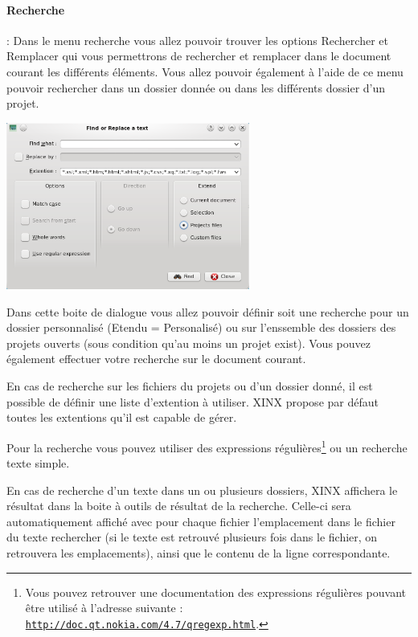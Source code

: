 \documentclass[a4paper,10pt,twoside]{book}
\begin{document}
\paragraph{Recherche} : Dans le menu recherche vous allez pouvoir trouver les options Rechercher et Remplacer qui vous permettrons de rechercher et remplacer dans le document courant les différents éléments. Vous allez pouvoir également à l'aide de ce menu pouvoir rechercher dans un dossier donnée ou dans les différents dossier d'un projet.

\begin{center}
 \includegraphics[width=0.60\textwidth]{./xinxsearch.png}
\end{center}


Dans cette boite de dialogue vous allez pouvoir définir soit une recherche pour un dossier personnalisé (Etendu = Personalisé) ou sur l'enssemble des dossiers des projets ouverts (sous condition qu'au moins un projet exist). Vous pouvez également effectuer votre recherche sur le document courant.

En cas de recherche sur les fichiers du projets ou d'un dossier donné, il est possible de définir une liste d'extention à utiliser. XINX propose par défaut toutes les extentions qu'il est capable de gérer. 

Pour la recherche vous pouvez utiliser des expressions régulières\footnote{Vous pouvez retrouver une documentation des expressions régulières pouvant être utilisé à l'adresse suivante : \hyperref{http://doc.qt.nokia.com/4.7/qregexp.html}{introduction}{}{\nolinkurl{http://doc.qt.nokia.com/4.7/qregexp.html}}.} ou un recherche texte simple.

En cas de recherche d'un texte dans un ou plusieurs dossiers, XINX affichera le résultat dans la boite à outils de résultat de la recherche. Celle-ci sera automatiquement affiché avec pour chaque fichier l'emplacement dans le fichier du texte rechercher (si le texte est retrouvé plusieurs fois dans le fichier, on retrouvera les emplacements), ainsi que le contenu de la ligne correspondante.
\end{document}
